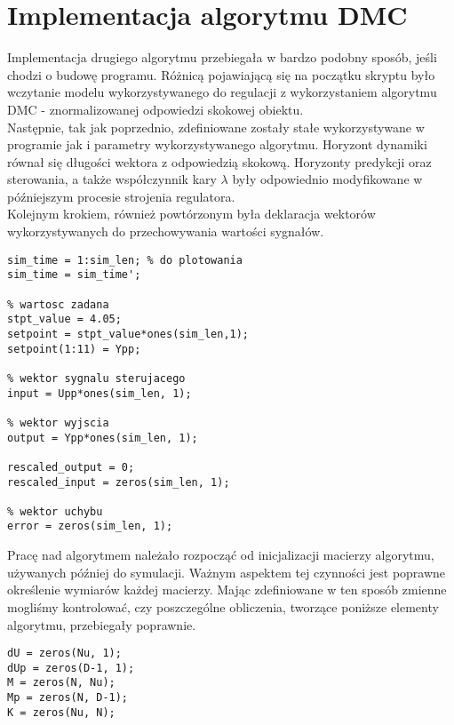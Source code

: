 \section{Implementacja algorytmu DMC}
\label{zad4_dmc}

Implementacja drugiego algorytmu przebiegała w bardzo podobny sposób, jeśli chodzi o budowę programu. Różnicą pojawiającą się na początku skryptu było wczytanie modelu wykorzystywanego do regulacji z wykorzystaniem algorytmu DMC - znormalizowanej odpowiedzi skokowej obiektu.\\
\indent{} Następnie, tak jak poprzednio, zdefiniowane zostały stałe wykorzystywane w programie jak i parametry wykorzystywanego algorytmu. Horyzont dynamiki równał się długości wektora z odpowiedzią skokową. Horyzonty predykcji oraz sterowania, a także współczynnik kary $\lambda$ były odpowiednio modyfikowane w późniejszym procesie strojenia regulatora. \\
\indent{} Kolejnym krokiem, również powtórzonym była deklaracja wektorów wykorzystywanych do przechowywania wartości sygnałów.

\begin{lstlisting}[style=custommatlab,frame=single,label={zad4_vecDMC_lst},caption={Inizjalizacja wektorów używanych do przechowywania sygnałów.},captionpos=b]
% czas symulacji
sim_time = 1:sim_len; % do plotowania
sim_time = sim_time';

% wartosc zadana
stpt_value = 4.05;
setpoint = stpt_value*ones(sim_len,1);
setpoint(1:11) = Ypp;

% wektor sygnalu sterujacego
input = Upp*ones(sim_len, 1);

% wektor wyjscia
output = Ypp*ones(sim_len, 1);

rescaled_output = 0;
rescaled_input = zeros(sim_len, 1);

% wektor uchybu
error = zeros(sim_len, 1);

\end{lstlisting}

Pracę nad algorytmem należało rozpocząć od inicjalizacji macierzy algorytmu, używanych później do symulacji. Ważnym aspektem tej czynności jest poprawne określenie wymiarów każdej macierzy. Mając zdefiniowane w ten sposób zmienne mogliśmy kontrolować, czy poszczególne obliczenia, tworzące poniższe elementy algorytmu, przebiegały poprawnie.
\\

\begin{lstlisting}[style=custommatlab,frame=single,label={zad4_sim_lst},caption={Definicja macierzy algorytmu DMC},captionpos=b]
dU = zeros(Nu, 1);
dUp = zeros(D-1, 1);
M = zeros(N, Nu);
Mp = zeros(N, D-1);
K = zeros(Nu, N);
\end{lstlisting}

